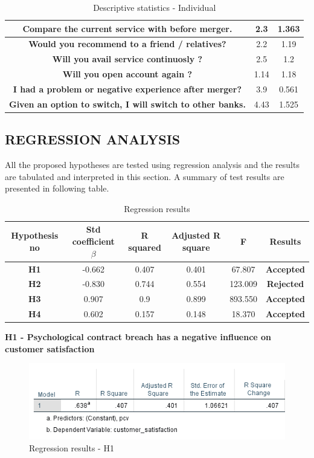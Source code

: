 \documentclass[a4paper, 14pt]{extarticle}
\begin{document}
{\begin{table}[H]
\begin{tabular}{|c|c|c|}
\hline
\textbf{ Compare the current service with before merger.} & 2.3 & 1.363 \\
\hline
\textbf{ Would you recommend to a friend / relatives?} & 2.2 & 1.19 \\
\hline
\textbf{ Will you avail service continuosly ?} & 2.5 & 1.2 \\
\hline
\textbf{ Will you open account again ?} & 1.14 & 1.18 \\
\hline
\textbf{ I had a problem or negative experience after merger?} & 3.9 & 0.561 \\
\hline
\textbf{ Given an option to switch, I will switch to other banks.} & 4.43 & 1.525 \\
\hline
\end{tabular}
\caption{Descriptive statistics - Individual}
\end{table}



\subsection{REGRESSION ANALYSIS}
All the proposed hypotheses are tested using regression analysis and the results are tabulated and interpreted in this section. A summary of test results are presented in following table.

\begin{table}[H]
\centering
\begin{tabular}{|c|c|c|c|c|c|}
\hline
Hypothesis no & Std coefficient $\beta$  & R squared & Adjusted R square & F & Results \\
\hline
\textbf{H1} & -0.662 & 0.407 & 0.401 & 67.807 & \textbf{Accepted} \\
\hline
\textbf{H2} & -0.830 & 0.744 & 0.554 & 123.009 & \textbf{Rejected} \\
\hline
\textbf{H3} & 0.907 & 0.9 & 0.899 & 893.550 & \textbf{Accepted} \\
\hline
\textbf{H4} & 0.602 & 0.157 & 0.148 & 18.370 & \textbf{Accepted} \\
\hline 
\end{tabular}
\caption{Regression results}
\end{table}
\newpage
\par \textbf{H1 - Psychological contract breach has a negative influence on customer satisfaction}\\
\begin{figure}[H]
\centering
\includegraphics[scale=1]{pcv_vs_customer_satisfaction.png}
\caption{Regression results - H1}
\end{figure}

}
\end{document}
